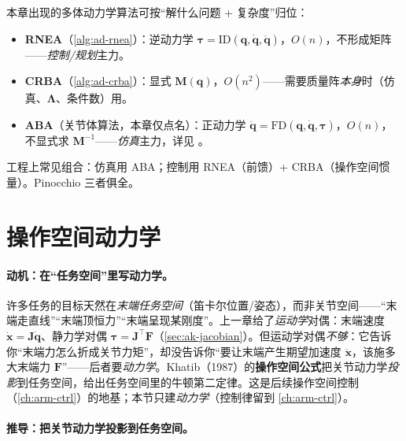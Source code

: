 \begin{note}
\label{note:ad-algo-family}
本章出现的多体动力学算法可按“解什么问题 + 复杂度”归位\cite{featherstone2008rbda}：
\begin{itemize}
  \item \textbf{RNEA}（\cref{alg:ad-rnea}）：逆动力学 $\boldsymbol{\tau}=\mathrm{ID}(\mathbf{q},\dot{\mathbf{q}},\ddot{\mathbf{q}})$，$O(n)$，不形成矩阵——\emph{控制/规划}主力。
  \item \textbf{CRBA}（\cref{alg:ad-crba}）：显式 $\mathbf{M}(\mathbf{q})$，$O(n^2)$——需要质量阵\emph{本身}时（仿真、$\boldsymbol{\Lambda}$、条件数）用。
  \item \textbf{ABA}（关节体算法，本章仅点名）：正动力学 $\ddot{\mathbf{q}}=\mathrm{FD}(\mathbf{q},\dot{\mathbf{q}},\boldsymbol{\tau})$，$O(n)$，不显式求 $\mathbf{M}^{-1}$——\emph{仿真}主力，详见 \cite{featherstone2008rbda}。
\end{itemize}
工程上常见组合：仿真用 ABA；控制用 RNEA（前馈）+ CRBA（操作空间惯量）。Pinocchio 三者俱全。
\end{note}

\section{操作空间动力学}
\label{sec:ad-osd}

\paragraph{动机：在“任务空间”里写动力学。}
许多任务的目标天然在\emph{末端任务空间}（笛卡尔位置/姿态），而非关节空间——“末端走直线”“末端顶恒力”“末端呈现某刚度”。上一章给了\emph{运动学}对偶：末端速度 $\dot{\mathbf{x}}=\mathbf{J}\dot{\mathbf{q}}$、静力学对偶 $\boldsymbol{\tau}=\mathbf{J}^\top\mathbf{F}$（\cref{sec:ak-jacobian}）。但运动学对偶\emph{不够}：它告诉你“末端力怎么折成关节力矩”，却没告诉你“要让末端产生期望加速度 $\ddot{\mathbf{x}}$，该施多大末端力 $\mathbf{F}$”——后者要\emph{动力学}。Khatib（1987）的\textbf{操作空间公式}把关节动力学\emph{投影}到任务空间，给出任务空间里的牛顿第二定律\cite{khatib1987operational}。这是后续操作空间控制（\cref{ch:arm-ctrl}）的地基；本节只建\emph{动力学}（控制律留到 \cref{ch:arm-ctrl}）。

\paragraph{推导：把关节动力学投影到任务空间。}

